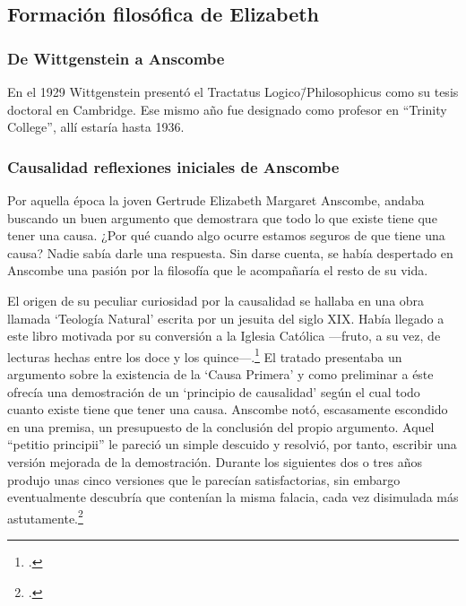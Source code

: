     \subsection{Formación filosófica de Elizabeth}
    \subsubsection{De Wittgenstein a Anscombe}
    En el 1929 Wittgenstein presentó el Tractatus Logico\=/Philosophicus como su
    tesis doctoral en Cambridge. Ese mismo año fue designado como profesor en
    ``Trinity College'', allí estaría hasta 1936.

    \subsubsection{Causalidad reflexiones iniciales de Anscombe}
    Por aquella época la joven Gertrude Elizabeth Margaret Anscombe, andaba buscando
    un buen argumento que demostrara que todo lo que existe tiene que tener una
    causa. ¿Por qué cuando algo ocurre estamos seguros de que tiene una causa? Nadie
    sabía darle una respuesta. Sin darse cuenta, se había despertado en Anscombe
    una pasión por la filosofía que le acompañaría el resto de su vida.

    El origen de su peculiar curiosidad por la causalidad se hallaba en una obra
    llamada `Teología Natural' escrita por un jesuita del siglo XIX. Había llegado a
    este libro motivada por su conversión a la Iglesia Católica ---fruto, a su vez,
    de lecturas hechas entre los doce y los quince---.\footcite[cf.~][p.~vii \S1]{M&PotM}
    El tratado presentaba un argumento sobre la existencia de la `Causa Primera' y
    como preliminar a éste ofrecía una demostración de un `principio de causalidad'
    según el cual todo cuanto existe tiene que tener una causa. Anscombe notó,
    escasamente escondido en una premisa, un presupuesto de la conclusión del propio
    argumento. Aquel ``petitio principii'' le pareció un simple descuido y resolvió,
    por tanto, escribir una versión mejorada de la demostración.
    Durante los siguientes dos o tres años produjo unas cinco versiones que le
    parecían satisfactorias, sin embargo eventualmente descubría que contenían la
    misma falacia, cada vez disimulada más astutamente.\footcite[cf.~][p.~vii
    \S2]{M&PotM} 

